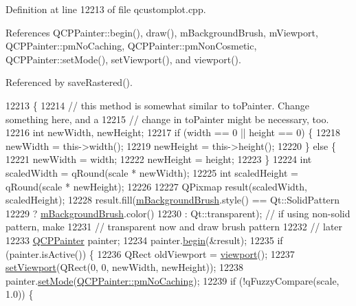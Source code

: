 Definition at line 12213 of file qcustomplot.\+cpp.



References Q\+C\+P\+Painter\+::begin(), draw(), m\+Background\+Brush, m\+Viewport, Q\+C\+P\+Painter\+::pm\+No\+Caching, Q\+C\+P\+Painter\+::pm\+Non\+Cosmetic, Q\+C\+P\+Painter\+::set\+Mode(), set\+Viewport(), and viewport().



Referenced by save\+Rastered().


\begin{DoxyCode}
12213                                                                  \{
12214   \textcolor{comment}{// this method is somewhat similar to toPainter. Change something here, and a}
12215   \textcolor{comment}{// change in toPainter might be necessary, too.}
12216   \textcolor{keywordtype}{int} newWidth, newHeight;
12217   \textcolor{keywordflow}{if} (width == 0 || height == 0) \{
12218     newWidth = this->width();
12219     newHeight = this->height();
12220   \} \textcolor{keywordflow}{else} \{
12221     newWidth = width;
12222     newHeight = height;
12223   \}
12224   \textcolor{keywordtype}{int} scaledWidth = qRound(scale * newWidth);
12225   \textcolor{keywordtype}{int} scaledHeight = qRound(scale * newHeight);
12226 
12227   QPixmap result(scaledWidth, scaledHeight);
12228   result.fill(\hyperlink{class_q_custom_plot_a3aef5de4ac012178e3293248e9c63737}{mBackgroundBrush}.style() == Qt::SolidPattern
12229                   ? \hyperlink{class_q_custom_plot_a3aef5de4ac012178e3293248e9c63737}{mBackgroundBrush}.color()
12230                   : Qt::transparent); \textcolor{comment}{// if using non-solid pattern, make}
12231                                       \textcolor{comment}{// transparent now and draw brush pattern}
12232                                       \textcolor{comment}{// later}
12233   \hyperlink{class_q_c_p_painter}{QCPPainter} painter;
12234   painter.\hyperlink{class_q_c_p_painter_a0a41146ccd619dceab6e25ec7b46b044}{begin}(&result);
12235   \textcolor{keywordflow}{if} (painter.isActive()) \{
12236     QRect oldViewport = \hyperlink{class_q_custom_plot_a953ecdbc28018e7e84cb6213ad3d88c2}{viewport}();
12237     \hyperlink{class_q_custom_plot_a3f9bc4b939dd8aaba9339fd09f273fc4}{setViewport}(QRect(0, 0, newWidth, newHeight));
12238     painter.\hyperlink{class_q_c_p_painter_af6b1f7d2bbc548b10aa55d8b6ad49577}{setMode}(\hyperlink{class_q_c_p_painter_a156cf16444ff5e0d81a73c615fdb156dae78f9a4eb277a5f9207f50850a51a0b0}{QCPPainter::pmNoCaching});
12239     \textcolor{keywordflow}{if} (!qFuzzyCompare(scale, 1.0)) \{

\end{DoxyCode}
